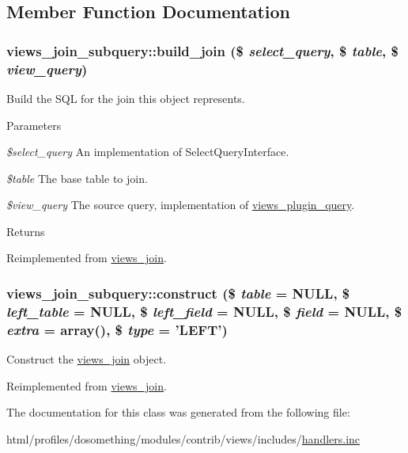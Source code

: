 \subsection{Member Function Documentation}
\hypertarget{classviews__join__subquery_aced6dd7573a138cd4f527b340fee501e}{
\subsubsection[{build\_\-join}]{\setlength{\rightskip}{0pt plus 5cm}views\_\-join\_\-subquery::build\_\-join (\$ {\em select\_\-query}, \/  \$ {\em table}, \/  \$ {\em view\_\-query})}}
\label{classviews__join__subquery_aced6dd7573a138cd4f527b340fee501e}
Build the SQL for the join this object represents.


\begin{DoxyParams}{Parameters}
\item[{\em \$select\_\-query}]An implementation of SelectQueryInterface. \item[{\em \$table}]The base table to join. \item[{\em \$view\_\-query}]The source query, implementation of \hyperlink{classviews__plugin__query}{views\_\-plugin\_\-query}. \end{DoxyParams}
\begin{DoxyReturn}{Returns}

\end{DoxyReturn}


Reimplemented from \hyperlink{classviews__join_a1e7fae5813fcec89a848bc6326f152c5}{views\_\-join}.\hypertarget{classviews__join__subquery_a27a49742ee109b1329adcb86512837ab}{
\subsubsection[{construct}]{\setlength{\rightskip}{0pt plus 5cm}views\_\-join\_\-subquery::construct (\$ {\em table} = {\ttfamily NULL}, \/  \$ {\em left\_\-table} = {\ttfamily NULL}, \/  \$ {\em left\_\-field} = {\ttfamily NULL}, \/  \$ {\em field} = {\ttfamily NULL}, \/  \$ {\em extra} = {\ttfamily array()}, \/  \$ {\em type} = {\ttfamily 'LEFT'})}}
\label{classviews__join__subquery_a27a49742ee109b1329adcb86512837ab}
Construct the \hyperlink{classviews__join}{views\_\-join} object. 

Reimplemented from \hyperlink{classviews__join_ac6c6e70389e0c59e4b068903ef4950b9}{views\_\-join}.

The documentation for this class was generated from the following file:\begin{DoxyCompactItemize}
\item 
html/profiles/dosomething/modules/contrib/views/includes/\hyperlink{handlers_8inc}{handlers.inc}\end{DoxyCompactItemize}
